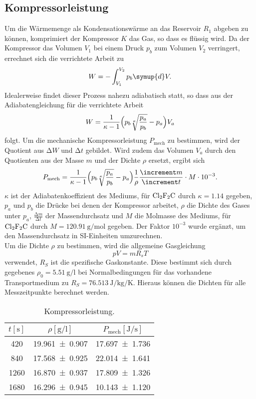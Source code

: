 \subsection{Kompressorleistung}
Um die Wärmemenge als Kondensationswärme an das Reservoir $R_1$ abgeben zu können, komprimiert der Kompressor $K$ das Gas, so dass es flüssig wird.
Da der Kompressor das Volumen $V_1$ bei einem Druck $p_b$ zum Volumen $V_2$ verringert, errechnet sich die verrichtete Arbeit zu
\begin{equation}
  W = - \int_{V_1}^{V_2} p_b \symup{d}V.
\end{equation}
Idealerweise findet dieser Prozess nahezu adiabatisch statt, so dass aus der Adiabatengleichung für die verrichtete Arbeit
\begin{equation}
  W = \frac{1}{\kappa -1}\Bigl(p_b \sqrt[\kappa]{\frac{p_a}{p_b}} - p_a \Bigr) V_a
\end{equation}
folgt.
Um die mechanische Kompressorleistung $P_{\text{mech}}$ zu bestimmen, wird der Quotient aus $\increment W$ und $\increment t$ gebildet.
Wird zudem das Volumen $V_a$ durch den Quotienten aus der Masse $m$ und der Dichte $\rho$ ersetzt, ergibt sich
\begin{equation}
  P_{\text{mech}} = \frac{1}{\kappa -1}\Bigl(p_b \sqrt[\kappa]{\frac{p_a}{p_b}} - p_a \Bigr) \frac{1}{\rho} \frac{\increment m}{\increment t} \cdot M \cdot 10^{-3}.
\end{equation}
$\kappa$ ist der Adiabatenkoeffizient des Mediums, für $\ce{Cl2F2C}$ durch $\kappa = 1.14$ gegeben, $p_a$ und $p_b$ die Drücke bei denen der Kompressor arbeitet, $\rho$ die Dichte des Gases unter $p_a$, $\frac{\increment m}{\increment t}$ der Massendurchsatz und $M$ die Molmasse des Mediums, für $\ce{Cl2F2C}$ durch $M = \SI{120.91}{\gram\per\mol}$ gegeben. Der Faktor $10^{-3}$ wurde ergänzt, um den Massendurchsatz in SI-Einheiten umzurechnen. \\
Um die Dichte $\rho$ zu bestimmen, wird die allgemeine Gasgleichung
\begin{equation}
  p V=m R_s T
\end{equation}
verwendet, $R_S$ ist die spezifische Gaskonstante. Diese bestimmt sich durch gegebenes $\rho_0=\SI{5,51}{\gram\per\litre}$ bei Normalbedingungen für das vorhandene Transportmedium zu $R_S = \SI{76.513}{\joule\per\kilogram\per\kelvin}$.\cite{sample}
Hieraus können die Dichten für alle Messzeitpunkte berechnet werden.
\begin{table}
  \centering
  \caption{Kompressorleistung.}
  \label{tab:tabelle4}
\begin{tabular}{c c c}
  \toprule
  {$t [\si{\second}]$} & {$\rho [\si{\gram\per\litre}]$} & {$P_{\text{mech}} [\si{\joule\per\second}]$}\\
  \midrule
  \num{420} & \num{19.961 +- 0.907} & \num{17.697 +- 1.736} \\
  \num{840} & \num{17.568 +- 0.925} & \num{22.014 +- 1.641} \\
  \num{1260} & \num{16.870 +- 0.937} & \num{17.809 +- 1.326} \\
  \num{1680} & \num{16.296 +- 0.945} & \num{10.143 +- 1.120} \\
  \bottomrule
\end{tabular}
\end{table}
